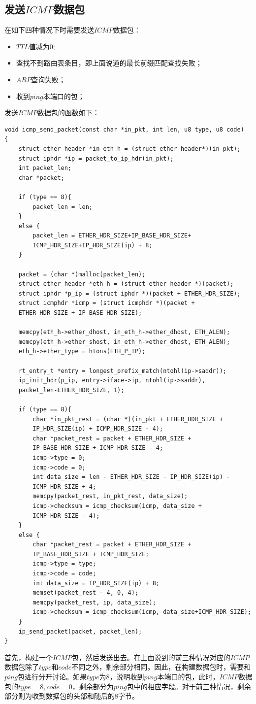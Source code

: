\documentclass[UTF8,noindent]{ctexart}
\begin{document}
\subsection*{发送$ICMP$数据包}
在如下四种情况下时需要发送$ICMP$数据包：
\begin{itemize}
  \item $TTL$值减为$0$;
	\item 查找不到路由表条目，即上面说道的最长前缀匹配查找失败；
	  \item $ARP$查询失败；
		\item 收到$ping$本端口的包；
\end{itemize}
发送$ICMP$数据包的函数如下：
\begin{lstlisting}
void icmp_send_packet(const char *in_pkt, int len, u8 type, u8 code)
{
	struct ether_header *in_eth_h = (struct ether_header*)(in_pkt);
	struct iphdr *ip = packet_to_ip_hdr(in_pkt);
	int packet_len;
	char *packet;
	
	if (type == 8){
		packet_len = len;
	}
	else {
		packet_len = ETHER_HDR_SIZE+IP_BASE_HDR_SIZE+
		ICMP_HDR_SIZE+IP_HDR_SIZE(ip) + 8;
	}

	packet = (char *)malloc(packet_len);
	struct ether_header *eth_h = (struct ether_header *)(packet);
	struct iphdr *p_ip = (struct iphdr *)(packet + ETHER_HDR_SIZE);
	struct icmphdr *icmp = (struct icmphdr *)(packet + 
	ETHER_HDR_SIZE + IP_BASE_HDR_SIZE);

	memcpy(eth_h->ether_dhost, in_eth_h->ether_dhost, ETH_ALEN);
	memcpy(eth_h->ether_shost, in_eth_h->ether_dhost, ETH_ALEN);
	eth_h->ether_type = htons(ETH_P_IP);

	rt_entry_t *entry = longest_prefix_match(ntohl(ip->saddr));
	ip_init_hdr(p_ip, entry->iface->ip, ntohl(ip->saddr), 
	packet_len-ETHER_HDR_SIZE, 1);

	if (type == 8){
		char *in_pkt_rest = (char *)(in_pkt + ETHER_HDR_SIZE + 
		IP_HDR_SIZE(ip) + ICMP_HDR_SIZE - 4);
		char *packet_rest = packet + ETHER_HDR_SIZE + 
		IP_BASE_HDR_SIZE + ICMP_HDR_SIZE - 4;
		icmp->type = 0;
		icmp->code = 0;
		int data_size = len - ETHER_HDR_SIZE - IP_HDR_SIZE(ip) - 
		ICMP_HDR_SIZE + 4;
		memcpy(packet_rest, in_pkt_rest, data_size);
		icmp->checksum = icmp_checksum(icmp, data_size + 
		ICMP_HDR_SIZE - 4);
	}
	else {
		char *packet_rest = packet + ETHER_HDR_SIZE +
		IP_BASE_HDR_SIZE + ICMP_HDR_SIZE;
		icmp->type = type;
		icmp->code = code;
		int data_size = IP_HDR_SIZE(ip) + 8;
		memset(packet_rest - 4, 0, 4);
		memcpy(packet_rest, ip, data_size);
		icmp->checksum = icmp_checksum(icmp, data_size+ICMP_HDR_SIZE);
	}
	ip_send_packet(packet, packet_len);
}
\end{lstlisting}
首先，构建一个$ICMP$包，然后发送出去。在上面说到的前三种情况对应的$ICMP$数据包除了$type$和$code$不同之外，剩余部分相同。因此，在构建数据包时，需要和$ping$包进行分开讨论。如果$type$为$8$，说明收到$ping$本端口的包，此时，$ICMP$数据包的$type = 8, code = 0$，剩余部分为$ping$包中的相应字段。对于前三种情况，剩余部分则为收到数据包的头部和随后的$8$字节。\\
\end{document}
